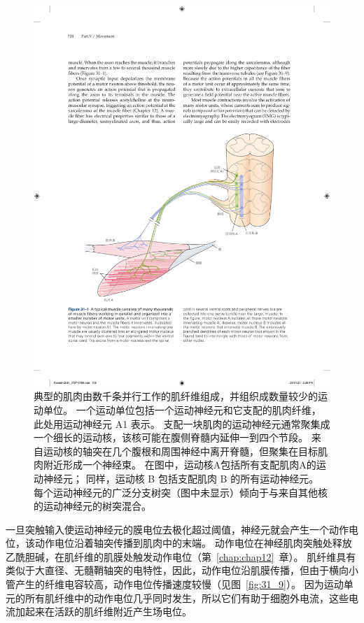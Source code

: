 \begin{figure}[htbp]
	\centering
	\includegraphics[width=1.0\linewidth]{chap31/fig_31_1}
	\caption{典型的肌肉由数千条并行工作的肌纤维组成，并组织成数量较少的运动单位。
		一个运动单位包括一个运动神经元和它支配的肌肉纤维，此处用运动神经元 A1 表示。
		支配一块肌肉的运动神经元通常聚集成一个细长的运动核，该核可能在腹侧脊髓内延伸一到四个节段。
		来自运动核的轴突在几个腹根和周围神经中离开脊髓，但聚集在目标肌肉附近形成一个神经束。
		在图中，运动核A包括所有支配肌肉A的运动神经元；
		同样，运动核 B 包括支配肌肉 B 的所有运动神经元。
		每个运动神经元的广泛分支树突（图中未显示）倾向于与来自其他核的运动神经元的树突混合。}
	\label{fig:31_1}
\end{figure}


一旦突触输入使运动神经元的膜电位去极化超过阈值，神经元就会产生一个动作电位，该动作电位沿着轴突传播到肌肉中的末端。
动作电位在神经肌肉突触处释放乙酰胆碱，在肌纤维的肌膜处触发动作电位（第~\ref{chap:chap12}~章）。
肌纤维具有类似于大直径、无髓鞘轴突的电特性，因此，动作电位沿肌膜传播，但由于横向小管产生的纤维电容较高，动作电位传播速度较慢（见图~\ref{fig:31_9}）。
因为运动单元的所有肌纤维中的动作电位几乎同时发生，所以它们有助于细胞外电流，这些电流加起来在活跃的肌纤维附近产生场电位。


